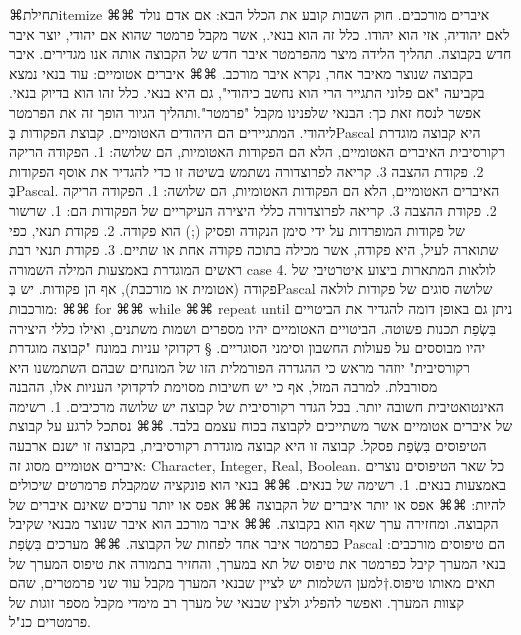       ⌘תחילת{itemize}
      ⌘⌘ איברים מורכבים. חוק השבות קובע את הכלל הבא: אם אדם נולד לאם יהודיה, אזי הוא יהודו. כלל זה הוא בנאי., אשר מקבל פרמטר שהוא אם יהודי, יוצר איבר חדש בקבוצה. תהליך הלידה מיצר מהפרמטר איבר חדש של הקבוצה אותה אנו מגדירים. איבר בקבוצה שנוצר מאיבר אחר, נקרא איבר מורכב.
      ⌘⌘ איברים אטומיים: עוד בנאי נמצא בקביעה "אם פלוני התגייר הרי הוא נחשב כיהודי", גם היא בנאי. כלל זהו הוא בדיוק בנאי. אפשר לנסח זאת כך: הבנאי שלפנינו מקבל "פרמטר".ותהליך הגיור הופך זה את הפרמטר ליהודי. המתגיירים הם היהודים האטומיים.
      קבוצת הפקודות בְּPascal היא קבוצה מוגדרת רקורסיבית
      האיברים האטומיים, הלא הם הפקודות האטומיות, הם שלושה:
      1. הפקודה הריקה
      2. פקודת ההצבה
      3. קריאה לפרוצדורה
      נשתמש בשיטה זו כדי להגדיר את אוסף הפקודות בְּPascal. האיברים האטומיים, הלא הם הפקודות האטומיות, הם שלושה:
      1. הפקודה הריקה
      2. פקודת ההצבה
      3. קריאה לפרוצדורה
      כללי היצירה העיקריים של הפקודות הם:
      1. שרשור של פקודות המופרדות על ידי סימן הנקודה ופסיק (;) הוא פקודה.
      2. פקודת תנאי, כפי שתוארה לעיל, היא פקודה, אשר מכילה בתוכה פקודה אחת או שתיים.
      3. פקודת תנאי רבת ראשים המוגדרת באמצעות המילה השמורה case
      4. לולאות המתארות ביצוע איטרטיבי של פקודה (אטומית או מורכבת), אף הן פקודות. יש בְּPascal שלושה סוגים של פקודות לולאה מורכבות:
      ⌘⌘ for
      ⌘⌘ while
      ⌘⌘ repeat until
      ניתן גם באופן דומה להגדיר את הביטויים בִּשְׂפַת תכנות פשוטה. הביטויים האטומיים יהיו מספרים ושמות משתנים, ואילו כללי היצירה יהיו מבוססים על פעולות החשבון וסימני הסוגריים.
      § דקדוקי עניות במונח "קבוצה מוגדרת רקורסיבית"
      יוזהר מראש כי ההגדרה הפורמלית הזו של המונחים שבהם השתמשנו היא מסורבלת. למרבה המזל, אף כי יש חשיבות מסוימת לדקדוקי העניות אלו, ההבנה האינטואטיבית חשובה יותר.
      בכל הגדר רקורסיבית של קבוצה יש שלושה מרכיבים.
      1. רשימה של איברים אטומיים אשר משתייכים לקבוצה בכוח עצמם בלבד.
      ⌘⌘ נסתכל לרגע על קבוצת הטיפוסים בִּשְׂפַת פסקל. קבוצה זו היא קבוצה מוגדרת רקורסיבית, בקבוצה זו ישנם ארבעה איברים אטומיים מסוג זה: Character, Integer, Real, Boolean. כל שאר הטיפוסים נוצרים באמצעות בנאים.
      1. רשימה של בנאים.
      ⌘⌘ בנאי הוא פונקציה שמקבלת פרמרטים שיכולים להיות:
      ⌘⌘ אפס או יותר איברים של הקבוצה
      ⌘⌘ אפס או יותר ערכים שאינם איברים של הקבוצה.
      ומחזירה ערך שאף הוא בקבוצה.
      ⌘⌘ איבר מורכב הוא איבר שנוצר מבנאי שקיבל כפרמטר איבר אחד לפחות של הקבוצה.
      ⌘⌘ מערכים בִּשְׂפַת Pascal הם טיפוסים מורכבים: בנאי המערך קיבל כפרמטר את טיפוס של תא במערך, והחזיר בתמורה את טיפוס המערך של תאים מאותו טיפוס.†{למען השלמות יש לציין שבנאי המערך מקבל עוד שני פרמטרים, שהם קצוות המערך. ואפשר להפליג ולצין שבנאי של מערך רב מימדי מקבל מספר זוגות של פרמטרים כנ"ל.}
